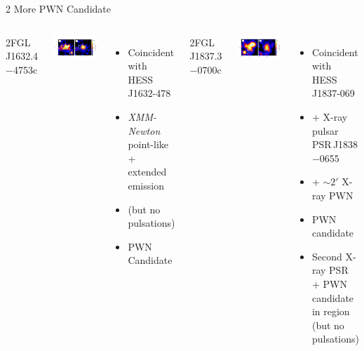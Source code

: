 \documentclass[12pt]{beamer}
\begin{document}
\begin{frame}{2 More PWN Candidate}


  \begin{columns}

2FGL\,J1632.4$-$4753c 

    \includegraphics[scale=0.3]{plots/source_HESS_J1632-478_color.pdf}

    \begin{itemize}
      \item Coincident with HESS\,J1632-478

      \item  {\em XMM-Newton} point-like + extended emission
      \item (but no pulsations)
      \item PWN Candidate
    \end{itemize}


    2FGL\,J1837.3$-$0700c 

    \includegraphics[scale=0.3]{plots/source_HESS_J1837-069_color.pdf}

    \begin{itemize}
      \item Coincident with HESS\,J1837-069
      \item + X-ray pulsar PSR\,J1838$-$0655 
      \item + $\sim 2'$ X-ray PWN 
      \item PWN candidate
      \item Second X-ray PSR + PWN candidate in region
        (but no pulsations)
    \end{itemize}

  \end{columns}
\end{frame}
\end{document}
